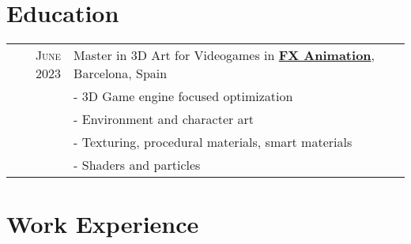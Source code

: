 \documentclass[a4paper,10pt]{article} %
\begin{document}
\pagestyle{empty} %


\par{ %
\vspace{10pt}
\par{\par} %
\par{\bigskip\par} %


\section{Education}

\begin{tabular}{rl}	
\textsc{June} 2023 & Master in 3D Art for Videogames in \href{https://www.fxbarcelonafilmschool.com/}{\textbf{FX Animation}}, Barcelona, Spain\\
& \footnotesize{- 3D Game engine focused optimization}\\
& \footnotesize{- Environment and character art}\\
& \footnotesize{- Texturing, procedural materials, smart materials}\\
& \footnotesize{- Shaders and particles}\\
\end{tabular}


\section{Work Experience}

}
\end{document}
